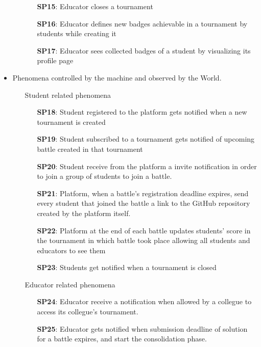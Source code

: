 \documentclass{article}
\begin{document}
\begin{itemize}
\begin{enumerate}
\begin{enumerate}
                        \item[\textbf{SP15}:] Educator closes a tournament
                        \item[\textbf{SP16}:] Educator defines new badges achievable in a tournament by students while creating it
                        \item[\textbf{SP17}:] Educator sees collected badges of a student by visualizing its profile page
                    \end{enumerate}
          \end{enumerate}

    \item Phenomena controlled by the machine and observed by the World.
          \begin{enumerate}
              \item[\ding{228}] Student related phenomena
                    \begin{enumerate}
                        \item[\textbf{SP18}:] Student registered to the platform gets notified when a new tournament is created
                        \item[\textbf{SP19}:] Student subscribed to a tournament gets notified of upcoming battle created in that tournament
                        \item[\textbf{SP20}:] Student receive from the platform a invite notification in order to join a group of students to join a battle.
                        \item[\textbf{SP21}:] Platform, when a battle's registration deadline expires, send every student that joined the battle a link to the GitHub repository created by the platform itself.
                        \item[\textbf{SP22}:] Platform at the end of each battle updates students' score in the tournament in which battle took place allowing all students and educators to see them
                        \item[\textbf{SP23}:] Students get notified when a tournament is closed
                    \end{enumerate}
              \item[\ding{228}] Educator related phenomena
                    \begin{enumerate}
                        \item[\textbf{SP24}:] Educator receive a notification when allowed by a collegue to access its collegue's tournament.
                        \item[\textbf{SP25}:] Educator gets notified when submission deadline of solution for a battle expires, and start the consolidation phase.
                    \end{enumerate}
          \end{enumerate}
\end{itemize}
\end{document}
